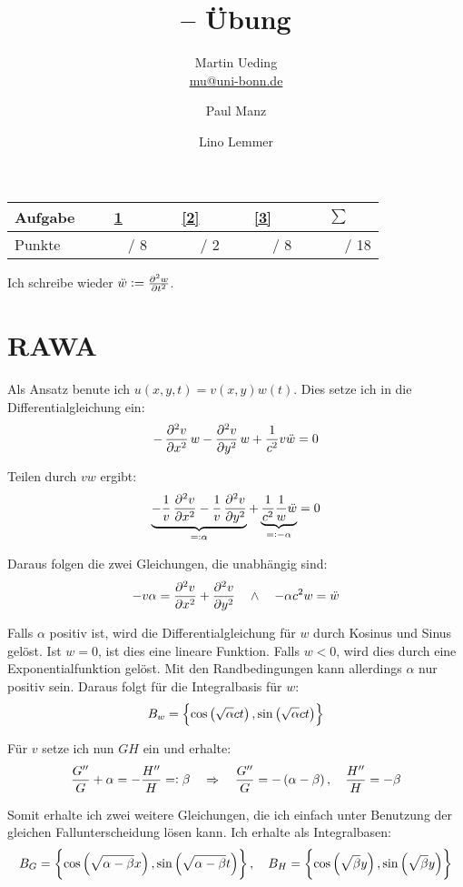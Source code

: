 \documentclass[11pt, ngerman, fleqn]{article}
\title{\themodul{} -- Übung \theuebung \\ \vspace{0.5cm} \large{\thegruppe}}
\author{Martin Ueding \\ \small{\href{mailto:mu@uni-bonn.de}{mu@uni-bonn.de}} \and Paul Manz \and Lino Lemmer}
\newcommand{\punkte}{\textcolor{white}{xxxxx}}
\begin{document}
\maketitle

\begin{table}[h]
	\centering
	\begin{tabular}{l|c|c|c|c}
		Aufgabe & \ref{1} & \ref{2} & \ref{3} & $\sum$   \\
		\hline
		Punkte & \punkte / 8 & \punkte / 2 & \punkte / 8 & \punkte / 18
	\end{tabular}
\end{table}

Ich schreibe wieder $\ddot w := \pd[2] wt$.


\section{RAWA}
\label{1}

Als Ansatz benute ich $u(x, y, t) = v(x, y) w(t)$. Dies setze ich in die Differentialgleichung ein:
\[
	- \dpd[2] vx w - \dpd[2] vy w + \frac{1}{c^2} v \ddot w = 0
\]

Teilen durch $vw$ ergibt:
\[
	\underbrace{- \frac 1v \dpd[2] vx - \frac 1v \dpd[2] vy}_{=: \alpha} + \underbrace{\frac{1}{c^2} \frac 1w \ddot w}_{=: -\alpha} = 0
\]

Daraus folgen die zwei Gleichungen, die unabhängig sind:
\[
	- v \alpha = \dpd[2] vx + \dpd[2] vy
	\quad \wedge \quad
	- \alpha c^2 w = \ddot w
\]

Falls $\alpha$ positiv ist, wird die Differentialgleichung für $w$ durch Kosinus und Sinus gelöst. Ist $w = 0$, ist dies eine lineare Funktion. Falls $w < 0$, wird dies durch eine Exponentialfunktion gelöst. Mit den Randbedingungen kann allerdings $\alpha$ nur positiv sein. Daraus folgt für die Integralbasis für $w$:
\[
	B_w = \set{
		\cos\del{\sqrt{\alpha} c t}, \sin\del{\sqrt{\alpha} c t}
	}
\]

Für $v$ setze ich nun $GH$ ein und erhalte:
\[
	\frac{G''}{G} + \alpha = - \frac{H''}{H} =: \beta
	\quad\Rightarrow\quad
	\frac{G''}{G} = - \del{\alpha - \beta}
	,\quad
	\frac{H''}{H} = - \beta
\]

Somit erhalte ich zwei weitere Gleichungen, die ich einfach unter Benutzung der
gleichen Fallunterscheidung lösen kann. Ich erhalte als Integralbasen:
\[
	B_G = \set{
	\cos\del{\sqrt{\alpha - \beta} x}, \sin\del{\sqrt{\alpha - \beta} t}
	}
	, \quad
	B_H = \set{
		\cos\del{\sqrt{\beta} y}, \sin\del{\sqrt{\beta} y}
	}
\]
\end{document}
